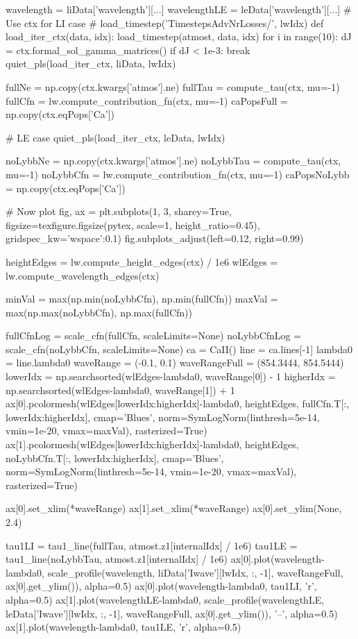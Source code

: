 \begin{pycode}[TimeDepRT]
    wavelength = liData['wavelength'][...]
    wavelengthLE = leData['wavelength'][...]
    # Use ctx for LI case
#     load_timestep('TimestepsAdvNrLosses/', lwIdx)
    def load_iter_ctx(data, idx):
        load_timestep(atmost, data, idx)
        for i in range(10):
            dJ = ctx.formal_sol_gamma_matrices()
            if dJ < 1e-3:
                break
    quiet_pls(load_iter_ctx, liData, lwIdx)

    fullNe = np.copy(ctx.kwargs['atmos'].ne)
    fullTau = compute_tau(ctx, mu=-1)
    fullCfn = lw.compute_contribution_fn(ctx, mu=-1)
    caPopsFull = np.copy(ctx.eqPops['Ca'])

    # LE case
    quiet_pls(load_iter_ctx, leData, lwIdx)

    noLybbNe = np.copy(ctx.kwargs['atmos'].ne)
    noLybbTau = compute_tau(ctx, mu=-1)
    noLybbCfn = lw.compute_contribution_fn(ctx, mu=-1)
    caPopsNoLybb = np.copy(ctx.eqPops['Ca'])

    # Now plot
    fig, ax = plt.subplots(1, 3, sharey=True, figsize=texfigure.figsize(pytex, scale=1, height_ratio=0.45),
    gridspec_kw={'wspace':0.1})
    fig.subplots_adjust(left=0.12, right=0.99)

    heightEdges = lw.compute_height_edges(ctx) / 1e6
    wlEdges = lw.compute_wavelength_edges(ctx)

    minVal = max(np.min(noLybbCfn), np.min(fullCfn))
    maxVal = max(np.max(noLybbCfn), np.max(fullCfn))

    fullCfnLog = scale_cfn(fullCfn, scaleLimits=None)
    noLybbCfnLog = scale_cfn(noLybbCfn, scaleLimits=None)
    ca = CaII()
    line = ca.lines[-1]
    lambda0 = line.lambda0
    waveRange = (-0.1, 0.1)
    waveRangeFull = (854.3444, 854.5444)
    lowerIdx = np.searchsorted(wlEdges-lambda0, waveRange[0]) - 1
    higherIdx = np.searchsorted(wlEdges-lambda0, waveRange[1]) + 1
    ax[0].pcolormesh(wlEdges[lowerIdx:higherIdx]-lambda0, heightEdges, fullCfn.T[:, lowerIdx:higherIdx], cmap='Blues', norm=SymLogNorm(linthresh=5e-14, vmin=1e-20, vmax=maxVal), rasterized=True)
    ax[1].pcolormesh(wlEdges[lowerIdx:higherIdx]-lambda0, heightEdges, noLybbCfn.T[:, lowerIdx:higherIdx], cmap='Blues', norm=SymLogNorm(linthresh=5e-14, vmin=1e-20, vmax=maxVal), rasterized=True)

    ax[0].set_xlim(*waveRange)
    ax[1].set_xlim(*waveRange)
    ax[0].set_ylim(None, 2.4)

    tau1LI = tau1_line(fullTau, atmost.z1[internalIdx] / 1e6)
    tau1LE = tau1_line(noLybbTau, atmost.z1[internalIdx] / 1e6)
    ax[0].plot(wavelength-lambda0, scale_profile(wavelength, liData['Iwave'][lwIdx, :, -1], waveRangeFull, ax[0].get_ylim()), alpha=0.5)
    ax[0].plot(wavelength-lambda0, tau1LI, 'r', alpha=0.5)
    ax[1].plot(wavelengthLE-lambda0, scale_profile(wavelengthLE, leData['Iwave'][lwIdx, :, -1], waveRangeFull, ax[0].get_ylim()), '--', alpha=0.5)
    ax[1].plot(wavelength-lambda0, tau1LE, 'r', alpha=0.5)


\end{pycode}

